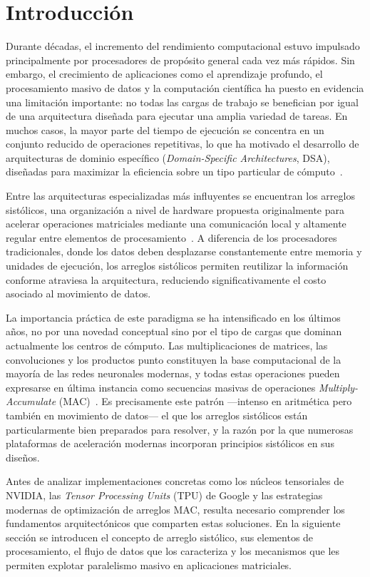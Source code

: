 \documentclass[conference]{IEEEtran}
\begin{document}
\section{Introducción}

Durante décadas, el incremento del rendimiento computacional estuvo impulsado principalmente por procesadores de propósito general cada vez más rápidos. Sin embargo, el crecimiento de aplicaciones como el aprendizaje profundo, el procesamiento masivo de datos y la computación científica ha puesto en evidencia una limitación importante: no todas las cargas de trabajo se benefician por igual de una arquitectura diseñada para ejecutar una amplia variedad de tareas. En muchos casos, la mayor parte del tiempo de ejecución se concentra en un conjunto reducido de operaciones repetitivas, lo que ha motivado el desarrollo de arquitecturas de dominio específico (\textit{Domain-Specific Architectures}, DSA), diseñadas para maximizar la eficiencia sobre un tipo particular de cómputo~\cite{liao2025nn}.

Entre las arquitecturas especializadas más influyentes se encuentran los arreglos sistólicos, una organización a nivel de hardware propuesta originalmente para acelerar operaciones matriciales mediante una comunicación local y altamente regular entre elementos de procesamiento~\cite{puscasu2024sa}. A diferencia de los procesadores tradicionales, donde los datos deben desplazarse constantemente entre memoria y unidades de ejecución, los arreglos sistólicos permiten reutilizar la información conforme atraviesa la arquitectura, reduciendo significativamente el costo asociado al movimiento de datos.

La importancia práctica de este paradigma se ha intensificado en los últimos años, no por una novedad conceptual sino por el tipo de cargas que dominan actualmente los centros de cómputo. Las multiplicaciones de matrices, las convoluciones y los productos punto constituyen la base computacional de la mayoría de las redes neuronales modernas, y todas estas operaciones pueden expresarse en última instancia como secuencias masivas de operaciones \textit{Multiply-Accumulate} (MAC)~\cite{liao2025nn}. Es precisamente este patrón ---intenso en aritmética pero también en movimiento de datos--- el que los arreglos sistólicos están particularmente bien preparados para resolver, y la razón por la que numerosas plataformas de aceleración modernas incorporan principios sistólicos en sus diseños.

Antes de analizar implementaciones concretas como los núcleos tensoriales de NVIDIA, las \textit{Tensor Processing Units} (TPU) de Google y las estrategias modernas de optimización de arreglos MAC, resulta necesario comprender los fundamentos arquitectónicos que comparten estas soluciones. En la siguiente sección se introducen el concepto de arreglo sistólico, sus elementos de procesamiento, el flujo de datos que los caracteriza y los mecanismos que les permiten explotar paralelismo masivo en aplicaciones matriciales.
\end{document}
